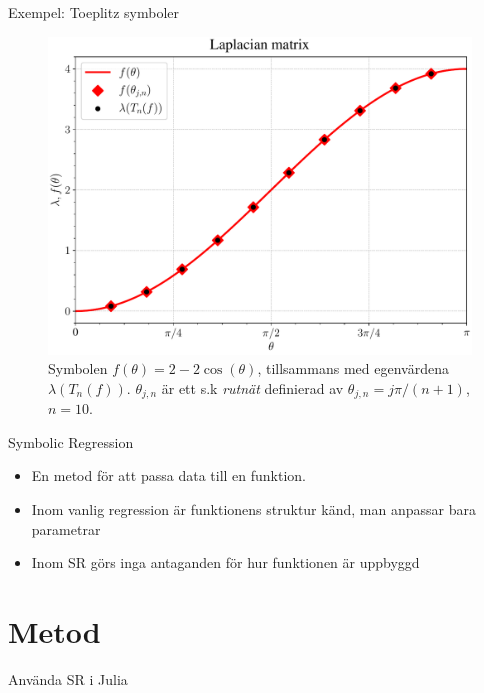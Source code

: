 \documentclass{beamer}
\begin{document}
\begin{frame}{Exempel: Toeplitz symboler}
    \begin{figure}
        \centering
        \includegraphics[width=0.7\linewidth]{images/Laplace_presentation.pdf}
        \caption{Symbolen $f(\theta)=2-2\cos(\theta)$, tillsammans med egenvärdena $\lambda(T_n(f))$. $\theta_{j,n}$ är ett s.k \textit{rutnät} definierad av $\theta_{j,n}=j\pi/(n+1)$, $n=10$.}
    \end{figure}
\end{frame}

\begin{frame}{Symbolic Regression}
\begin{itemize}
    \item En metod för att passa data till en funktion. \\
    \item Inom vanlig regression är funktionens struktur känd, man anpassar bara parametrar \\
    \item Inom SR görs inga antaganden för hur funktionen är uppbyggd
\end{itemize}
\end{frame}


\section{Metod}
\begin{frame}{Använda SR i Julia}
     
\end{frame}
\end{document}
